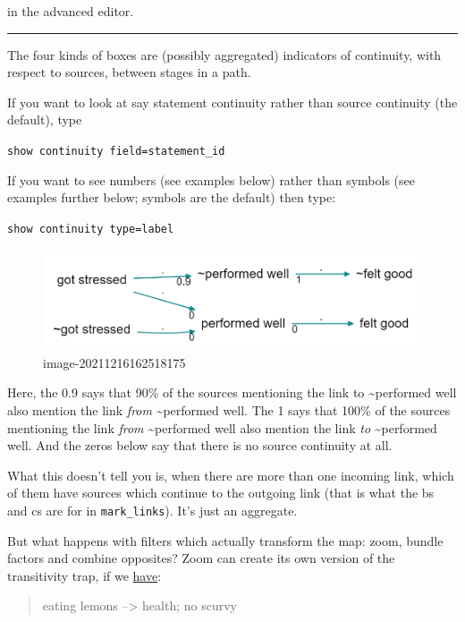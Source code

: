 \documentclass[
]{book}
\begin{document}
in the advanced editor.

\begin{center}\rule{0.5\linewidth}{0.5pt}\end{center}

The four kinds of boxes are (possibly aggregated) indicators of continuity, with respect to sources, between stages in a path.

If you want to look at say statement continuity rather than source continuity (the default), type

\texttt{show\ continuity\ field=statement\_id}

If you want to see numbers (see examples below) rather than symbols (see examples further below; symbols are the default) then type:

\texttt{show\ continuity\ type=label}

\begin{figure}
\centering
\includegraphics[width=6.77083in,height=\textheight]{_assets/image-20211216162518175.png}
\caption{image-20211216162518175}
\end{figure}

Here, the 0.9 says that 90\% of the sources mentioning the link to \textasciitilde performed well also mention the link \emph{from} \textasciitilde performed well. The 1 says that 100\% of the sources mentioning the link \emph{from} \textasciitilde performed well also mention the link \emph{to} \textasciitilde performed well. And the zeros below say that there is no source continuity at all.

What this doesn't tell you is, when there are more than one incoming link, which of them have sources which continue to the outgoing link (that is what the bs and cs are for in \texttt{mark\_links}). It's just an aggregate.

But what happens with filters which actually transform the map: zoom, bundle factors and combine opposites? Zoom can create its own version of the transitivity trap, if we \href{https://causalmap.shinyapps.io/CM2test/?s=415}{have}:

\begin{quote}
eating lemons --\textgreater{} health; no scurvy
\end{quote}
\end{document}
